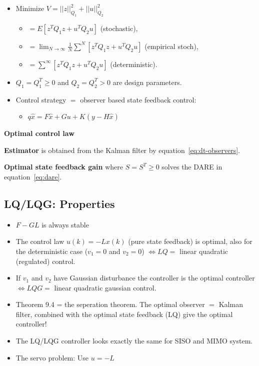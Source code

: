 \begin{multicols}{2}
\begin{itemize}
\item Minimize $V = ||z||^2_{Q_1} + ||u||^2_{Q_2}$
    \begin{itemize}
    \item $= E[z^TQ_1z + u^TQ_2u]$ (stochastic),
    \item $= \lim_{N\to\infty} \frac{1}{N}\sum^N[z^TQ_1z + u^TQ_2u]$ (empirical stoch),
    \item $= \sum^{\infty}[z^TQ_1z + u^TQ_2u]$ (deterministic).
    \end{itemize}
\item $Q_1 = Q^T_1 \geq 0$ and $Q_2 = Q^T_2 > 0$ are design parameters.
\item Control strategy $=$ observer based state feedback control:
    \begin{itemize}
    \item $q\hat{x} = F\hat{x} + Gu + K(y-H\hat{x})$
    \end{itemize}
\end{itemize}
\textbf{Optimal control law}

\textbf{Estimator} is obtained from the Kalman filter 
by equation~\ref{eq:dt-observers}.

\textbf{Optimal state feedback gain}
where $S=S^T\geq0$ solves the DARE in equation~\ref{eq:dare}.



\subsection{LQ/LQG: Properties}
\begin{itemize}
    \item $F-GL$ is always stable
    \item The control law $u(k) = -Lx(k)$ (pure state feedback) is optimal, also for the deterministic case ($v_1 = 0$ and $v_2 = 0$)
    $\Leftrightarrow LQ =$ linear quadratic (regulated) control.
    \item If $v_1$ and $v_2$ have Gaussian disturbance the controller is the optimal controller 
    $\Leftrightarrow LQG =$ linear quadratic gaussian control.
    \item Theorem 9.4 = the seperation theorem. The optimal observer $=$ Kalman filter, 
    combined with the optimal state feedback (LQ) give the optimal controller!
    \item The LQ/LQG controller looks exactly the same for SISO and MIMO system.
    \item The servo problem: Use $u = -L$
\end{itemize}



\end{multicols}
